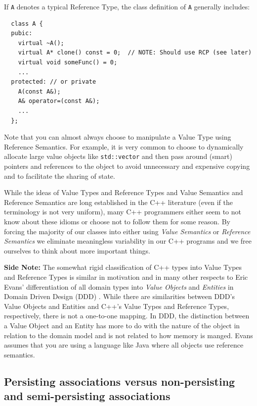 \documentclass[pdf,ps2pdf,11pt]{SANDreport}
\begin{document}
If {}\texttt{A} denotes a typical Reference Type, the class definition
of {}\texttt{A} generally includes:

{\small\begin{verbatim}
  class A {
  pubic:
    virtual ~A();
    virtual A* clone() const = 0;  // NOTE: Should use RCP (see later)
    virtual void someFunc() = 0;
    ...
  protected: // or private
    A(const A&);
    A& operator=(const A&);
    ...
  };
\end{verbatim}}

Note that you can almost always choose to manipulate a Value Type
using Reference Semantics.  For example, it is very common to choose
to dynamically allocate large value objects like
{}\texttt{std::vector} and then pass around (smart) pointers and
references to the object to avoid unnecessary and expensive copying
and to facilitate the sharing of state.

While the ideas of Value Types and Reference Types and Value Semantics
and Reference Semantics are long established in the C++ literature
(even if the terminology is not very uniform), many C++ programmers
either seem to not know about these idioms or choose not to follow them
for some reason.  By forcing the majority of our classes into either
using {}\textit{Value Semantics} or {}\textit{Reference Semantics} we
eliminate meaningless variability in our C++ programs and we free
ourselves to think about more important things.

{}\textbf{Side Note:} The somewhat rigid classification of C++ types
into Value Types and Reference Types is similar in motivation and in
many other respects to Eric Evans' differentiation of all domain types
into {}\textit{Value Objects} and {}\textit{Entities} in Domain Driven
Design (DDD) {}\cite{DomainDrivenDesign}.  While there are
similarities between DDD's Value Objects and Entities and C++'s Value
Types and Reference Types, respectively, there is not a one-to-one
mapping.  In DDD, the distinction between a Value Object and an Entity
has more to do with the nature of the object in relation to the domain
model and is not related to how memory is manged.  Evans assumes that
you are using a language like Java where all objects use reference
semantics.


%
{}\subsection{Persisting associations versus non-persisting and
semi-persisting associations}
\label{sec:persisting-nonpersisting-associations}
%
\end{document}
